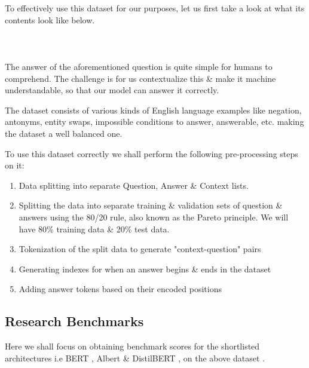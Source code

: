 \documentclass[11pt]{article}
\begin{document}
	To effectively use this dataset for our purposes, let us first take a look at what its contents look like below.\\ \\
	\noindent{}
	\\ \\
	
	The answer of the aforementioned question is quite simple for humans to comprehend. The challenge is for us contextualize this \& make it machine understandable, so that our model can answer it correctly.
	
	The dataset consists of various kinds of English language examples like negation, antonyms, entity swaps, impossible conditions to answer, answerable, etc. making the dataset a well balanced one. 
	
	To use this dataset correctly we shall perform the following pre-processing steps on it:
	
	\begin{enumerate}
		\item Data splitting into separate Question, Answer \& Context lists.
		\item Splitting the data into separate training \& validation sets of  question \& answers using the 80/20 rule, also known as the Pareto principle. We will have 80\% training data \& 20\% test data.
		\item Tokenization of the split data to generate "context-question" pairs
		\item Generating indexes for when an answer begins \& ends in the dataset
		\item Adding answer tokens based on their encoded positions
	\end{enumerate}	
	\subsection{Research Benchmarks}\label{benchmarks}
	Here we shall focus on obtaining benchmark scores for the shortlisted architectures i.e BERT \citep{bert}, Albert \cite{albert} \& DistilBERT \citep{distil}, on the above dataset \citep{dataset}. 
	
\end{document}
